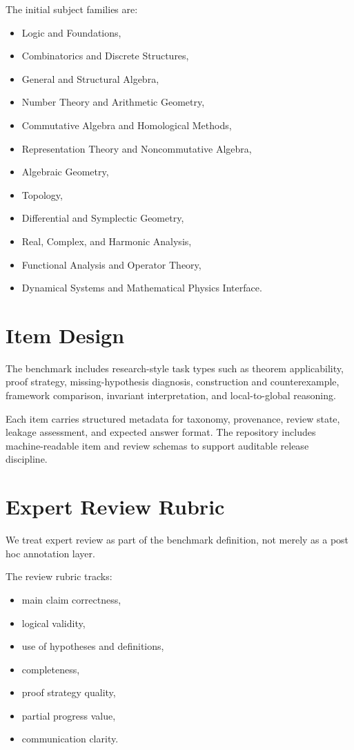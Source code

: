 \documentclass[11pt]{article}
\begin{document}
The initial subject families are:
\begin{itemize}[leftmargin=*]
  \item Logic and Foundations,
  \item Combinatorics and Discrete Structures,
  \item General and Structural Algebra,
  \item Number Theory and Arithmetic Geometry,
  \item Commutative Algebra and Homological Methods,
  \item Representation Theory and Noncommutative Algebra,
  \item Algebraic Geometry,
  \item Topology,
  \item Differential and Symplectic Geometry,
  \item Real, Complex, and Harmonic Analysis,
  \item Functional Analysis and Operator Theory,
  \item Dynamical Systems and Mathematical Physics Interface.
\end{itemize}

\section{Item Design}

The benchmark includes research-style task types such as theorem applicability, proof strategy, missing-hypothesis diagnosis, construction and counterexample, framework comparison, invariant interpretation, and local-to-global reasoning.

Each item carries structured metadata for taxonomy, provenance, review state, leakage assessment, and expected answer format. The repository includes machine-readable item and review schemas to support auditable release discipline.

\section{Expert Review Rubric}

We treat expert review as part of the benchmark definition, not merely as a post hoc annotation layer.

The review rubric tracks:
\begin{itemize}[leftmargin=*]
  \item main claim correctness,
  \item logical validity,
  \item use of hypotheses and definitions,
  \item completeness,
  \item proof strategy quality,
  \item partial progress value,
  \item communication clarity.
\end{itemize}
\end{document}
